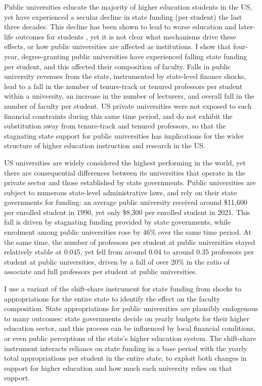 \documentclass[notitlepage,12pt]{article}
\begin{document}
\noindent
Public universities educate the majority of higher education students in the US, yet have experienced a secular decline in state funding (per student) the last three decades.
This decline has been shown to lead to worse education and later-life outcomes for students \citep{NBERw23736,NBERw27885}, yet it is not clear what mechanisms drive these effects, or how public universities are affected as institutions.
I show that four-year, degree-granting public universities have experienced falling state funding per student, and this affected their composition of faculty.
Falls in public university revenues from the state, instrumented by state-level finance shocks, lead to a fall in the number of tenure-track or tenured professors per student within a university, an increase in the number of lecturers, and overall fall in the number of faculty per student.
US private universities were not exposed to such financial constraints during this same time period, and do not exhibit the substitution away from tenure-track and tenured professors, so that the stagnating state support for public universities has implications for the wider structure of higher education instruction and research in the US.

US universities are widely considered the highest performing in the world, yet there are consequential differences between its universities that operate in the private sector and those established by state governments.
Public universities are subject to numerous state-level administrative laws, and rely on their state governments for funding: an average public university received around \$11,600 per enrolled student in 1990, yet only \$8,300 per enrolled student in 2021.
This fall is driven by stagnating funding provided by state governments, while enrolment among public universities rose by 46\% over the same time period.
At the same time, the number of professors per student at public universities stayed relatively stable at 0.045, yet fell from around 0.04 to around 0.35 professors per student at public universities, driven by a fall of over 20\% in the ratio of associate and full professors per student at public universities.

I use a variant of the \cite{NBERw23736,NBERw27885} shift-share instrument for state funding from shocks to appropriations for the entire state to identify the effect on the faculty composition.
State appropriations for public universities are plausibly endogenous to many outcomes: state governments decide on yearly budgets for their higher education sector, and this process can be influenced by local financial conditions, or even public perceptions of the state's higher education system.
The shift-share instrument interacts reliance on state funding in a base period with the yearly total appropriations per student in the entire state, to exploit both changes in support for higher education and how much each university relies on that support.
\end{document}
